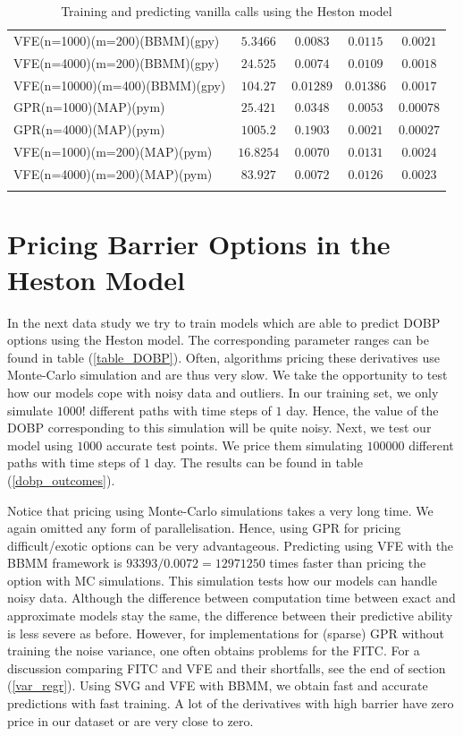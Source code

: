 \documentclass[12pt,a4paper,oneside]{book}
\begin{document}
\begin{table}
\begin{tabular}[t]{lcccc}
VFE(n=1000)(m=200)(BBMM)(gpy)  & $5.3466$   & $0.0083$ & $0.0115$ & $0.0021$    \\\addlinespace
VFE(n=4000)(m=200)(BBMM)(gpy)  &  $24.525$  & $0.0074$ & $0.0109$ &  $0.0018$   \\\addlinespace
VFE(n=10000)(m=400)(BBMM)(gpy) &$104.27$ & $0.01289$ & $0.01386$ &  $0.0017$  \\\addlinespace
GPR(n=1000)(MAP)(pym)  & $25.421$   & $0.0348$  & $0.0053$ &  $0.00078$   \\\addlinespace
GPR(n=4000)(MAP)(pym)  & $1005.2$   & $0.1903$ & $0.0021$ &  $0.00027$   \\\addlinespace
VFE(n=1000)(m=200)(MAP)(pym)  &  $16.8254$  & $0.0070$ & $0.0131$  & $0.0024$    \\\addlinespace
VFE(n=4000)(m=200)(MAP)(pym)  & $83.927$   & $0.0072$ & $0.0126$ & $0.0023$    \\\addlinespace
\\\bottomrule
\end{tabular}
\caption{Training and predicting vanilla calls using the Heston model}\label{Result_Heston_Vanilla_Call}
\end{table}

\clearpage

\section{Pricing Barrier Options in the Heston Model}

In the next data study we try to train models which are able to predict DOBP options using the Heston model. The corresponding parameter ranges can be found in table (\ref{table_DOBP}). Often, algorithms pricing these derivatives use Monte-Carlo simulation and are thus very slow. We take the opportunity to test how our models cope with noisy data and outliers. In our training set, we only simulate $1000$! different paths with time steps of $1$ day. Hence, the value of the DOBP corresponding to this simulation will be quite noisy. Next, we test our model using $1000$ accurate test points. We price them simulating $100000$ different paths with time steps of $1$ day.  The results can be found in table (\ref{dobp_outcomes}). 

Notice that pricing using Monte-Carlo simulations takes a very long time. We again omitted any form of parallelisation. Hence, using GPR for pricing difficult/exotic options can be very advantageous. Predicting using VFE with the BBMM framework is $93393 / 0.0072 = 12971250$ times faster than pricing the option with MC simulations.  This simulation tests how our models can handle noisy data. Although the difference between computation time between exact and approximate models stay the same, the difference between their predictive ability is less severe as before.  However, for implementations for (sparse) GPR without training the noise variance, one often obtains problems for the FITC. For a discussion comparing FITC and VFE and their shortfalls, see the end of section (\ref{var_regr}). Using SVG and VFE with BBMM, we obtain fast and accurate predictions with fast training. A lot of the derivatives with high barrier have zero price in our dataset or are very close to zero. 
\end{document}
